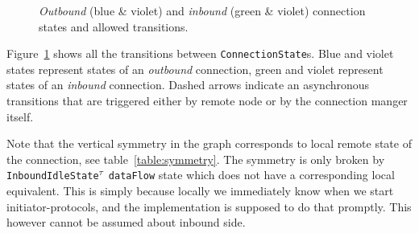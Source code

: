 \documentclass{article}
\def\InboundIdleStateAny{\texttt{InboundIdleState\textsuperscript{$\tau$} dataFlow}}
\def\DemotedToColdDupRem{\textsf{DemotedToCold}\textsuperscript{\textsf{Duplex}}\textsubscript{\textsf{Remote}}}
\def\DemotedToColdUniLoc{\textsf{DemotedToCold}\textsuperscript{\textsf{Unidirectional}}\textsubscript{\textsf{Local}}}
\def\CommitDup{\textsf{Commit}\textsuperscript{\textsf{Duplex}}}
\def\CommitUni{\textsf{Commit}\textsuperscript{\textsf{Unidirectional}}}
\def\AwakeUniRem{\textsf{Awake}\textsuperscript{\textsf{Unidirectional}}\textsubscript{\textsf{Remote}}}
\def\Terminate{\textsf{Terminate}}
\begin{document}
\begin{figure}[p]
{}
  \caption{\textit{Outbound} (blue \& violet) and \textit{inbound} (green \&
  violet) connection states and allowed transitions.}
  \label{fig:statediagram}
\end{figure}

Figure~\ref{fig:statediagram} shows all the transitions between
\texttt{ConnectionState}s.  Blue and violet states represent states of
an \textit{outbound} connection, green and violet represent states of an
\textit{inbound} connection.  Dashed arrows indicate an asynchronous
transitions that are triggered either by remote node or by the connection
manger itself.

Note that the vertical symmetry in the graph corresponds to local \/ remote
state of the connection, see table~\ref{table:symmetry}.  The symmetry is only
broken by \InboundIdleStateAny{} state which does not have a corresponding
local equivalent.  This is simply because locally we immediately know when we
start initiator-protocols, and the implementation is supposed to do that
promptly.  This however cannot be assumed about inbound side.
\end{document}
